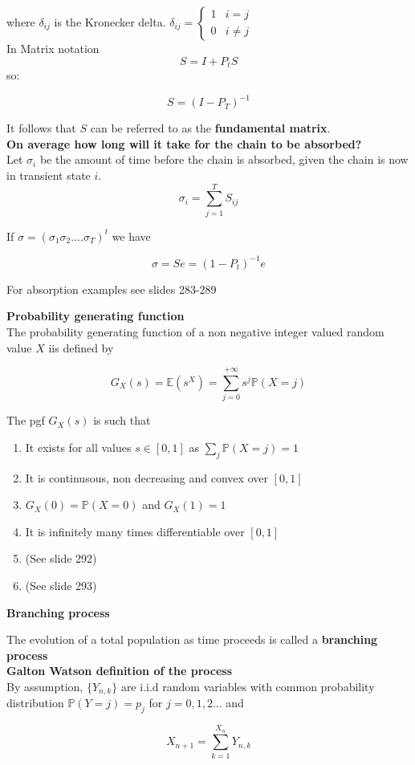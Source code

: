 where $\delta_{ij}$ is the Kronecker delta. $\delta_{ij} = \begin{cases}1 & i = j \\ 0 & i \neq j \end{cases}$\\

In Matrix notation\\

$$S = I + P_tS$$
so:

$$S = (I - P_T)^{-1}$$

It follows that $S$ can be referred to as the \textbf{fundamental matrix}.\\

\textbf{On average how long will it take for the chain to be absorbed?}\\

Let $\sigma_i$ be the amount of time before the chain is absorbed, given the chain is now in transient state $i$.
$$\sigma_i = \sum_{j=1}^T S_{ij}$$

If $\sigma = (\sigma_1 \sigma_2.... \sigma_T)^t$ we have

$$\sigma = Se = (1 - P_t)^{-1} e$$

For absorption examples see slides 283-289

\textbf{Probability generating function}\\

The probability generating function of a non negative integer valued random value $X$ iis defined by

$$G_X(s) = \mathbb{E}(s^X) = \sum_{j=0}^{+\infty} s^j \mathbb{P}(X = j)$$

The pgf $G_X(s)$ is such that
\begin{enumerate}
	\item It exists for all values $s \in [0,1]$ as $\sum_{j} \mathbb{P}(X = j) = 1$
	\item It is continusous, non decreasing and convex over $[0,1]$
	\item $G_X(0) = \mathbb{P}(X=0)$ and $G_X(1) = 1$
	\item It is infinitely many times differentiable over $[0,1]$ 
	\item (See slide 292)
	\item (See slide 293)
\end{enumerate}

\textbf{Branching process}

The evolution of a total population as time proceeds is called a \textbf{branching process}\\

\textbf{Galton Watson definition of the process}\\

By assumption, $\{ Y_{n,k} \}$ are i.i.d random variables with common probability distribution $\mathbb{P}(Y = j) = p_j$ for $j = 0,1,2...$ and 
	
$$X_{n+1} = \sum_{k=1}^{X_n} Y_{n,k}$$